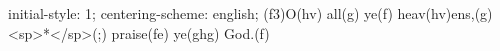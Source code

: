 initial-style: 1;
centering-scheme: english;
(f3)O(hv) all(g) ye(f) heav(hv)ens,(g) <sp>*</sp>(;) praise(fe) ye(ghg) God.(f)
